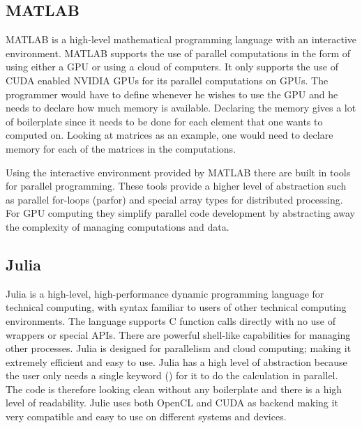 \subsection{MATLAB}
MATLAB is a high-level mathematical programming language with an interactive environment.
MATLAB supports the use of parallel computations in the form of using either a GPU or using a cloud of computers.
It only supports the use of CUDA enabled NVIDIA GPUs for its parallel computations on GPUs.
The programmer would have to define whenever he wishes to use the GPU and he needs to declare how much memory is available.
Declaring the memory gives a lot of boilerplate since it needs to be done for each element that one wants to computed on.
Looking at matrices as an example, one would need to declare memory for each of the matrices in the computations.\citep{MATLAB_backend,MATLAB_benchmark,}

Using the interactive environment provided by MATLAB there are built in tools for parallel programming.
These tools provide a higher level of abstraction such as parallel for-loops (parfor) and special array types for distributed processing.
For GPU computing they simplify parallel code development by abstracting away the complexity of managing computations and data.\citep{MATLAB_parallel}

\subsection{Julia}
Julia is a high-level, high-performance dynamic programming language for technical computing, with syntax familiar to users of other technical computing environments.
The language supports C function calls directly with no use of wrappers or special APIs.
There are powerful shell-like capabilities for managing other processes.
Julia is designed for parallelism and cloud computing; making it extremely efficient and easy to use.
Julia has a high level of abstraction because the user only needs a single keyword (\@parallel) for it to do the calculation in parallel.
The code is therefore looking clean without any boilerplate and there is a high level of readability.
Julie uses both OpenCL and CUDA as backend making it very compatible and easy to use on different systems and devices.\citep{Julia_Git,Julia}

